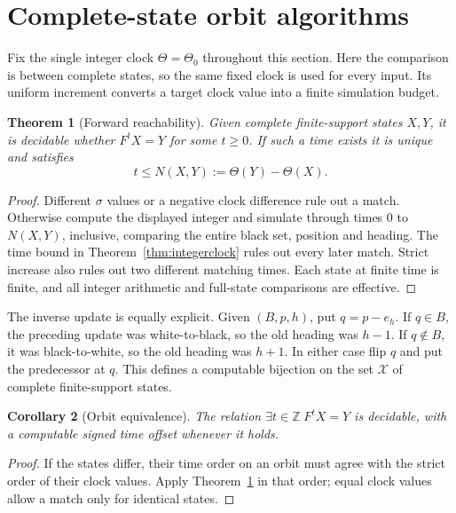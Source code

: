 \documentclass[11pt,a4paper]{article}
\newtheorem{theorem}{Theorem}[section]
\newtheorem{corollary}[theorem]{Corollary}
\theoremstyle{remark}\newtheorem{remark}[theorem]{Remark}
\newcommand{\Z}{\mathbb Z}\newcommand{\N}{\mathbb N}\newcommand{\Q}{\mathbb Q}
\begin{document}
\section{Complete-state orbit algorithms}\label{sec:orbit}
Fix the single integer clock $\Theta=\Theta_0$ throughout this section.
Here the comparison is between complete states, so the same fixed clock is
used for every input. Its uniform increment converts a target clock value
into a finite simulation budget.

\begin{theorem}[Forward reachability]\label{thm:reach}
Given complete finite-support states $X,Y$, it is decidable whether
$F^tX=Y$ for some $t\ge0$. If such a time exists it is unique and satisfies
\[
 t\le N(X,Y):=\Theta(Y)-\Theta(X).
\]
\end{theorem}
\begin{proof}
Different $\sigma$ values or a negative clock difference rule out a match.
Otherwise compute the displayed integer and simulate through times $0$ to
$N(X,Y)$, inclusive, comparing the entire black set, position and heading.
The time bound in Theorem~\ref{thm:integerclock} rules out every later match. Strict increase also
rules out two different matching times. Each state at finite time is finite,
and all integer arithmetic and full-state comparisons are effective.
\end{proof}

The inverse update is equally explicit. Given $(B,p,h)$, put $q=p-e_h$.
If $q\in B$, the preceding update was white-to-black, so the old heading was
$h-1$. If $q\notin B$, it was black-to-white, so the old heading was $h+1$.
In either case flip $q$ and put the predecessor at $q$. This defines a computable
bijection on the set $\mathcal X$ of complete finite-support states.

\begin{corollary}[Orbit equivalence]
The relation $\exists t\in\Z\;F^tX=Y$ is decidable, with a computable signed
time offset whenever it holds.
\end{corollary}
\begin{proof}
If the states differ, their time order on an orbit must agree with the strict
order of their clock values. Apply Theorem~\ref{thm:reach} in that order;
equal clock values allow a match only for identical states.
\end{proof}
\end{document}

